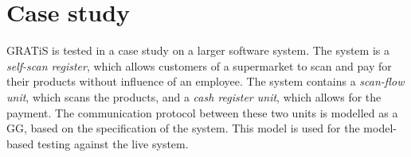 \section{Case study}\label{sec:case-study}

GRATiS is tested in a case study on a larger software system. The system is a \textit{self-scan register}, which allows customers of a supermarket to scan and pay for their products without influence of an employee. The system contains a \textit{scan-flow unit}, which scans the products, and a \textit{cash register unit}, which allows for the payment. The communication protocol between these two units is modelled as a GG, based on the specification of the system. This model is used for the model-based testing against the live system.
